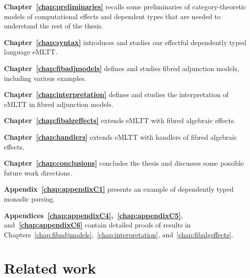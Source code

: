 \noindent
\textbf{Chapter~\ref{chap:preliminaries}} recalls some preliminaries of category-theoretic models of computational effects and dependent types that are needed to understand the rest of the thesis.

\vspace{0.05cm}

\noindent
\textbf{Chapter~\ref{chap:syntax}} introduces and studies our effectful dependently typed language eMLTT.


\vspace{0.05cm}

\noindent
\textbf{Chapter~\ref{chap:fibadjmodels}} defines and studies fibred adjunction models, including various examples.

\vspace{0.05cm}

\noindent
\textbf{Chapter~\ref{chap:interpretation}} defines and studies the interpretation of eMLTT in fibred adjunction models. 

\vspace{0.05cm}

\noindent
\textbf{Chapter~\ref{chap:fibalgeffects}} extends eMLTT with fibred algebraic effects.



\vspace{0.05cm}

\noindent
\textbf{Chapter~\ref{chap:handlers}} extends eMLTT with handlers of fibred algebraic effects.

\vspace{0.05cm}

\noindent
\textbf{Chapter~\ref{chap:conclusions}} concludes the thesis and discusses some possible future work directions.


\vspace{0.05cm}

\noindent
\textbf{Appendix~\ref{chap:appendixC1}} presents an example of dependently typed monadic parsing.

\vspace{0.05cm}

\noindent
\textbf{Appendices~\ref{chap:appendixC4},~\ref{chap:appendixC5}}, and\textbf{~\ref{chap:appendixC6}} contain detailed proofs of results in Chapters~\ref{chap:fibadjmodels},~\ref{chap:interpretation}, and~\ref{chap:fibalgeffects}.


\section{Related work}
\label{sect:relatedwork}

